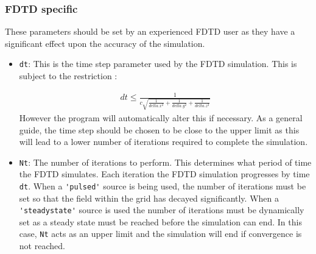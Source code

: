 \documentclass[a4paper, 12pt]{article}
\begin{document}
	\subsubsection{FDTD specific}
	These parameters should be set by an experienced FDTD user as they
	have a significant effect upon the accuracy of the simulation.
	\begin{itemize}
		\item \verb+dt+: This is the time step parameter used by the FDTD
		simulation. This is subject to the restriction \cite{taflove00book}:

		\begin{eqnarray}
			dt\le \frac{1}{c\sqrt{\frac{1}{delta.x^2}+\frac{1}{delta.y^2}+\frac{1}{delta.z^2}}}
		\end{eqnarray}
		However the program will automatically alter this if necessary. As a
		general guide, the time step should be chosen to be close to the
		upper limit as this will lead to a lower number of iterations
		required to complete the simulation.
		\item \verb+Nt+: The number of iterations to perform. This determines
		what period of time the FDTD simulates. Each iteration the FDTD
		simulation progresses by time \verb+dt+. When a \verb+'pulsed'+
		source is being used, the number of iterations
		must be set so that the field within the grid has decayed
		significantly. When a \verb+'steadystate'+ source is used the number
		of iterations must be dynamically set as a steady state must be
		reached before the simulation can end. In this case, \verb+Nt+ acts
		as an upper limit and the simulation will end if convergence is not reached.
	\end{itemize}
\end{document}

